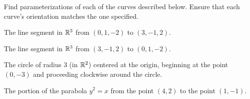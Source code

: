 \begin{activity} \label{A:12.2.1}  
\nin Find parameterizations of each of the curves described
below. Ensure that each curve's orientation matches the one specified.
\ba
\item The line segment in $\mathbb{R}^3$ from $(0,1,-2)$ to $(3,-1,2)$.
\item The line segment in $\mathbb{R}^3$ from $(3,-1,2)$ to $(0,1,-2)$.
\item The circle of radius $3$ (in $\mathbb{R}^2$) centered at the origin,
  beginning at the point $(0,-3)$ and proceeding clockwise around the
  circle.
\item The portion of the parabola $y^2 = x$ from the point $(4,2)$ to
  the point $(1,-1)$.
\ea
\end{activity}
\begin{smallhint}

\end{smallhint}
\begin{bighint}

\end{bighint}
\begin{activitySolution}

\end{activitySolution}
\aftera
